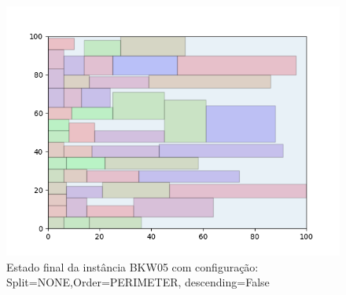 \begin{figure}[H]
    \centering
    \caption[]{Estado final da instância BKW05 com configuração: Split=NONE,Order=PERIMETER, descending=False}
    \label{fig:bkw05-none-perimeter-false}
    \includegraphics[scale=0.5]{output/figures/bkw/bkw05/none/perimeter/false/00}
\end{figure}
